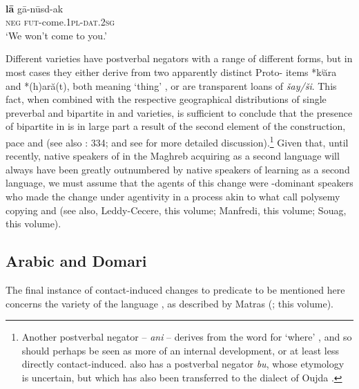 \documentclass[output=paper]{langsci/langscibook}
\begin{document}
\ea\label{}
{        \citep[58]{Souag2009}}\\
\gll \textbf{lā} gā-nūsd-ak\\
     \textsc{neg} \textsc{fut-}come\textsc{.1pl-dat.2sg}\\
\glt ‘We won’t come to you.’
\z

{Different  varieties have postverbal negators with a range of different forms, but in most cases they either derive from two apparently distinct Proto- items *kʲăra and *(h)ară(t), both meaning ‘thing’ \citep[332]{Kossmann2013book}, or are transparent loans of  \textit{šay/ši}. This fact, when combined with the respective geographical distributions of single preverbal and bipartite  in  and  varieties, is sufficient to conclude that the presence of bipartite  in  is in large part a result of  the second element of the  construction, pace \citet{Brugnatelli1987} and \citet{Lafkioui2013reinventing} (see also \citealt{Kossmann2013book}: 334; and see \citealt{Lucas2007,Lucas2009} for more detailed discussion).\footnote{Another postverbal negator –  \textit{ani} – derives from the word for ‘where’ \citep{Rabhi1992}, and so should perhaps be seen as more of an internal development, or at least less directly contact-induced.  also has a postverbal negator \textit{bu}, whose etymology is uncertain, but which has also been transferred to the   dialect of Oujda \citep{Lafkioui2013bu}.} Given that, until recently, native speakers of  in the Maghreb acquiring  as a second language will always have been greatly outnumbered by native speakers of  learning  as a second language, we must assume that the agents of this change were -dominant speakers who made the change under  agentivity in a process akin to what \citet{HeineKuteva2005} call polysemy copying and  (see also, Leddy-Cecere, this volume; Manfredi, this volume; Souag, this volume).}


\subsection{Arabic and Domari}


The final instance of contact-induced changes to predicate  to be mentioned here concerns the  variety of the  language , as described by Matras (\citeyear{Matras1999,Matras2007Domari,Matras2012}; this volume).
\end{document}
